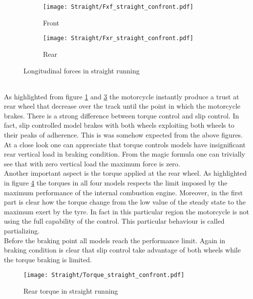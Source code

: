 %
\begin{figure}[!ht]
    \begin{subfigure}{0.5\linewidth}
        \texttt{[image: Straight/Fxf\_straight\_confront.pdf]}
        \caption{Front}
        \label{fig:Straight3a}
    \end{subfigure}%
    \begin{subfigure}{0.5\linewidth}
        \texttt{[image: Straight/Fxr\_straight\_confront.pdf]}
        \caption{Rear}
        \label{fig:Straight3b}
    \end{subfigure}
    \caption{Longitudinal forces in straight running}
\end{figure}
%
\\
As highlighted from figure \ref{fig:Straight3a} and \ref{fig:Straight3b} the motorcycle instantly produce a trust at rear wheel that decrease over the track until the point in which the motorcycle brakes. There is a strong difference between torque control and slip control. In fact, slip controlled model brakes with both wheels exploiting both wheels to their peaks of adherence. This is was somehow expected from the above figures.\\
At a close look one can appreciate that torque controls models have insignificant rear vertical load in braking condition. From the magic formula one can trivially see that with zero vertical load the maximum force is zero.\\
Another important aspect is the torque applied at the rear wheel. As highlighted in figure \ref{fig:StraightTorque} the torques in all four models respects the limit imposed by the maximum performance of the internal combustion engine. Moreover, in the first part is clear how the torque change from the low value of the steady state to the maximum exert by the tyre. In fact in this particular region the motorcycle is not using the full capability of the control. This particular behaviour is called partializing. \\
Before the braking point all models reach the performance limit. Again in braking condition is clear that slip control take advantage of both wheels while the torque braking is limited.\\
%
\begin{figure}%
    \centering
    \texttt{[image: Straight/Torque\_straight\_confront.pdf]}
    \caption{Rear torque in straight running}
    \label{fig:StraightTorque}
\end{figure}
%
%